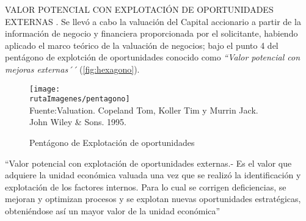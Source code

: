 \textcolor{secundario}{VALOR POTENCIAL CON EXPLOTACI\'ON DE OPORTUNIDADES EXTERNAS
.} Se llev\'o a cabo la valuaci\'on del Capital accionario a partir de la informaci\'on de negocio y financiera proporcionada por el solicitante, habiendo aplicado el marco
te\'orico de la valuaci\'on de negocios; bajo el punto 4 del pent\'agono de explotci\'on de oportunidades conocido como \textit{``Valor potencial con mejoras externas´´}  (\textcolor{terciario}{\autoref{fig:hexagono}}).

\begin{figure}[H]
\centering
\caption{Pent\'agono de Explotaci\'on de oportunidades\label{fig:hexagono}}
\texttt{[image: \\rutaImagenes/pentagono]}\\
Fuente:Valuation. Copeland Tom, Koller Tim y Murrin Jack.\\

John Wiley \& Sons. 1995.
\end{figure}

``\textcolor{secundario}{Valor potencial con explotaci\'on de oportunidades externas}.- Es el valor que adquiere la unidad econ\'omica valuada una vez que se realiz\'o la identificaci\'on y explotaci\'on de los factores internos. Para lo cual se corrigen deficiencias, se mejoran y optimizan procesos y se explotan nuevas oportunidades estrat\'egicas, obteni\'endose as\'i un mayor valor de la unidad econ\'omica''\\

